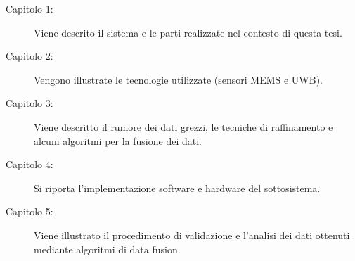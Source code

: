 \begin{description}
\item [Capitolo 1:] Viene descrito il sistema e le parti realizzate nel contesto di questa tesi.
\item [Capitolo 2:] Vengono illustrate le tecnologie utilizzate (sensori MEMS e UWB).
\item [Capitolo 3:] Viene descritto il rumore dei dati grezzi, le tecniche di raffinamento e alcuni algoritmi per la fusione dei dati.
\item [Capitolo 4:] Si riporta l'implementazione software e hardware del sottosistema.
\item [Capitolo 5:] Viene illustrato il procedimento di validazione e l'analisi dei dati ottenuti mediante algoritmi di data fusion.
\end{description}